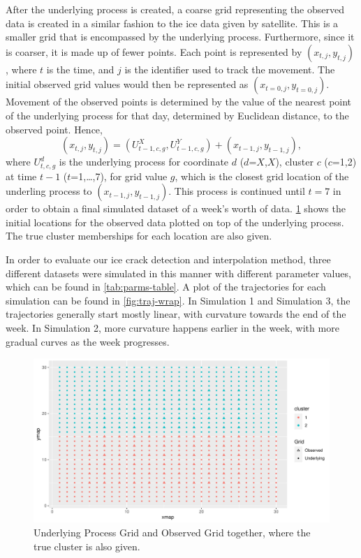 \documentclass[12pt]{article}
\begin{document}
After the underlying process is created, a coarse grid representing the
observed data is created in a similar fashion to the ice data given by
satellite. This is a smaller grid that is encompassed by the underlying
process. Furthermore, since it is coarser, it is made up of fewer
points. Each point is represented by \((x_{t,j}, y_{t,j})\), where \(t\)
is the time, and \(j\) is the identifier used to track the movement. The
initial observed grid values would then be represented as
\((x_{t=0,j}, y_{t=0,j})\). Movement of the observed points is
determined by the value of the nearest point of the underlying process
for that day, determined by Euclidean distance, to the observed point.
Hence,
\[(x_{t,j}, y_{t,j}) = (U^{X}_{t-1,c,g}, U^{Y}_{t-1,c,g}) + (x_{t-1,j}, y_{t-1,j}),\]
where \(U^d_{t,c,g}\) is the underlying process for coordinate \(d\)
(\(d\)=\(X\),\(X\)), cluster \(c\) (\(c\)=1,2) at time \(t-1\)
(\(t\)=1,\ldots,7), for grid value \(g\), which is the closest grid
location of the underling process to \((x_{t-1,j}, y_{t-1,j})\). This
process is continued until \(t=7\) in order to obtain a final simulated
dataset of a week's worth of data. \cref{fig:grids-combined} shows the
initial locations for the observed data plotted on top of the underlying
process. The true cluster memberships for each location are also given.

In order to evaluate our ice crack detection and interpolation method,
three different datasets were simulated in this manner with different
parameter values, which can be found in \cref{tab:parms-table}. A plot
of the trajectories for each simulation can be found in
\cref{fig:traj-wrap}. In Simulation 1 and Simulation 3, the trajectories
generally start mostly linear, with curvature towards the end of the
week. In Simulation 2, more curvature happens earlier in the week, with
more gradual curves as the week progresses.

\begin{figure}[tbp]

{\centering \includegraphics[width=\linewidth,]{spatio-temporal-model-arctic-sea-ice_files/figure-latex/grids-combined-1} 

}

\caption[Simulation Grids]{Underlying Process Grid and Observed Grid together, where the true cluster is also given.}\label{fig:grids-combined}
\end{figure}
\end{document}
